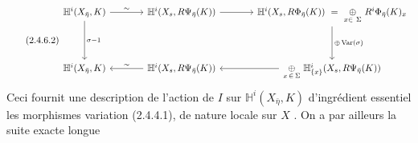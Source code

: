 \begin{equation}\tag{2.4.6.2}
\begin{tikzcd}[column sep=large, row sep=huge]
\mathbb{H}^i(X_{\bar\eta}, K) \arrow[r, "\sim"] \arrow[d, "\sigma-1"] & \mathbb{H}^i(X_s, R\Psi_{\bar\eta}(K)) \arrow[r] & \mathbb{H}^i(X_s, R\Phi_{\bar\eta}(K)) \ =\ \underset{x\in\ \Sigma}{\oplus}\ R^i\Phi_{\bar\eta}(K)_x \arrow[d, "{\oplus\, \mathrm{Var}(\sigma)}"] \\
\mathbb{H}^i(X_{\bar\eta}, K) & \mathbb{H}^i(X_s, R\Psi_{\bar\eta}(K)) \arrow[l, "\sim"'] & \underset{x\, \in\, \Sigma}{\oplus}\ \mathbb{H}^i_{\{x\}}(X_s, R\Psi_{\bar\eta}(K)) \arrow[l]
\end{tikzcd}
\end{equation}
Ceci fournit une description de l'action de $I$ sur $\mathbb{H}^i(X_{\bar\eta}, K)$ d'ingrédient essentiel les morphismes variation (2.4.4.1), de nature locale sur $X$ . On a par ailleurs la suite exacte longue

